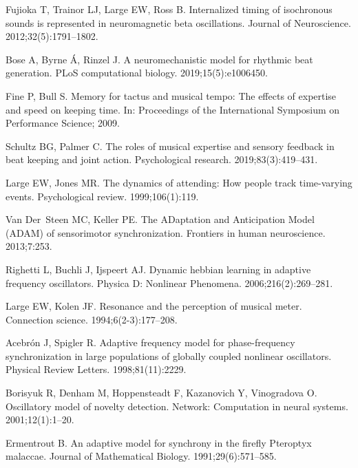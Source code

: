 \documentclass[10pt,letterpaper]{article}
\begin{document}
\begin{thebibliography}{10}
Fujioka T, Trainor LJ, Large EW, Ross B.
\newblock Internalized timing of isochronous sounds is represented in
  neuromagnetic beta oscillations.
\newblock Journal of Neuroscience. 2012;32(5):1791--1802.

Bose A, Byrne {\'A}, Rinzel J.
\newblock A neuromechanistic model for rhythmic beat generation.
\newblock PLoS computational biology. 2019;15(5):e1006450.

Fine P, Bull S.
\newblock Memory for tactus and musical tempo: The effects of expertise and
  speed on keeping time.
\newblock In: Proceedings of the International Symposium on Performance
  Science; 2009.

Schultz BG, Palmer C.
\newblock The roles of musical expertise and sensory feedback in beat keeping
  and joint action.
\newblock Psychological research. 2019;83(3):419--431.

Large EW, Jones MR.
\newblock The dynamics of attending: How people track time-varying events.
\newblock Psychological review. 1999;106(1):119.

Van Der~Steen MC, Keller PE.
\newblock The ADaptation and Anticipation Model (ADAM) of sensorimotor
  synchronization.
\newblock Frontiers in human neuroscience. 2013;7:253.

Righetti L, Buchli J, Ijspeert AJ.
\newblock Dynamic hebbian learning in adaptive frequency oscillators.
\newblock Physica D: Nonlinear Phenomena. 2006;216(2):269--281.

Large EW, Kolen JF.
\newblock Resonance and the perception of musical meter.
\newblock Connection science. 1994;6(2-3):177--208.

Acebr{\'o}n J, Spigler R.
\newblock Adaptive frequency model for phase-frequency synchronization in large
  populations of globally coupled nonlinear oscillators.
\newblock Physical Review Letters. 1998;81(11):2229.

Borisyuk R, Denham M, Hoppensteadt F, Kazanovich Y, Vinogradova O.
\newblock Oscillatory model of novelty detection.
\newblock Network: Computation in neural systems. 2001;12(1):1--20.

Ermentrout B.
\newblock An adaptive model for synchrony in the firefly Pteroptyx malaccae.
\newblock Journal of Mathematical Biology. 1991;29(6):571--585.


\end{thebibliography}
\end{document}
